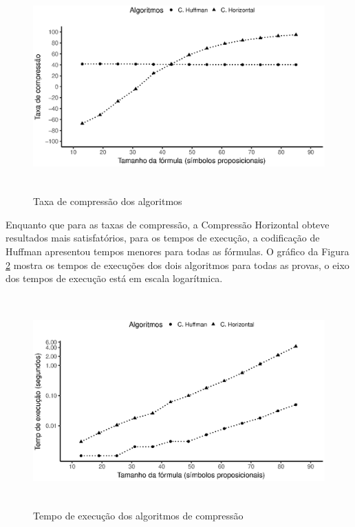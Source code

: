 \begin{figure}[H]
  \begin{center}
    \includegraphics[height=230pt,width=400pt]{images/plot_taxa_comp.eps}
    \caption{Taxa de compressão dos algoritmos}
    \label{fig:taxa_comp}
  \end{center}
\end{figure}

Enquanto que para as taxas de compressão, a Compressão Horizontal obteve resultados mais satisfatórios, para os tempos de execução, a codificação de Huffman apresentou tempos menores para todas as fórmulas. O gráfico da Figura \ref{fig:exec_time} mostra os tempos de execuções dos dois algoritmos para todas as provas, o eixo dos tempos de execução está em escala logarítmica.

\begin{figure}[H]
  \begin{center}
    \includegraphics[height=230pt,width=400pt]{images/plot_exec_time.eps}
    \caption{Tempo de execução dos algoritmos de compressão}
    \label{fig:exec_time}
  \end{center}
\end{figure}